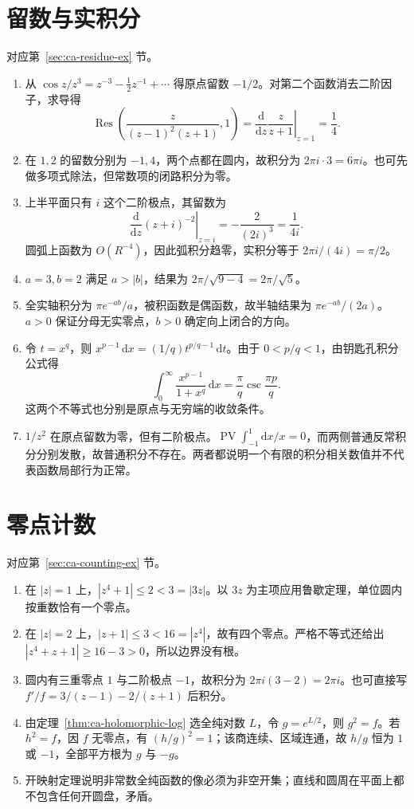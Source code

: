 \section{留数与实积分}
对应第~\ref{sec:ca-residue-ex} 节。
\begin{enumerate}
 \item 从 $\cos z/z^3=z^{-3}-\tfrac12z^{-1}+\cdots$ 得原点留数 $-1/2$。对第二个函数消去二阶因子，求导得
 \[
 \operatorname{Res}\left(\frac z{(z-1)^2(z+1)},1\right)
 =\left.\frac{\mathrm d}{\mathrm dz}\frac z{z+1}\right|_{z=1}
 =\frac14.
 \]
 \item 在 $1,2$ 的留数分别为 $-1,4$，两个点都在圆内，故积分为 $2\pi i\cdot3=6\pi i$。也可先做多项式除法，但常数项的闭路积分为零。
 \item 上半平面只有 $i$ 这个二阶极点，其留数为
 \[
 \left.\frac{\mathrm d}{\mathrm dz}(z+i)^{-2}\right|_{z=i}
 =-\frac2{(2i)^3}=\frac1{4i}.
 \]
 圆弧上函数为 $O(R^{-4})$，因此弧积分趋零，实积分等于 $2\pi i/(4i)=\pi/2$。
 \item $a=3,b=2$ 满足 $a>|b|$，结果为 $2\pi/\sqrt{9-4}=2\pi/\sqrt5$。
 \item 全实轴积分为 $\pi e^{-ab}/a$，被积函数是偶函数，故半轴结果为 $\pi e^{-ab}/(2a)$。$a>0$ 保证分母无实零点，$b>0$ 确定向上闭合的方向。
 \item 令 $t=x^q$，则 $x^{p-1}\,\mathrm dx=(1/q)t^{p/q-1}\,\mathrm dt$。由于 $0<p/q<1$，由钥匙孔积分公式得
 \[
 \int_0^\infty\frac{x^{p-1}}{1+x^q}\,\mathrm dx
 =\frac\pi q\csc\frac{\pi p}q.
 \]
 这两个不等式也分别是原点与无穷端的收敛条件。
 \item $1/z^2$ 在原点留数为零，但有二阶极点。$\operatorname{PV}\int_{-1}^1\mathrm dx/x=0$，而两侧普通反常积分分别发散，故普通积分不存在。两者都说明一个有限的积分相关数值并不代表函数局部行为正常。
\end{enumerate}

\section{零点计数}
对应第~\ref{sec:ca-counting-ex} 节。
\begin{enumerate}
 \item 在 $|z|=1$ 上，$|z^4+1|\le2<3=|3z|$。以 $3z$ 为主项应用鲁歇定理，单位圆内按重数恰有一个零点。
 \item 在 $|z|=2$ 上，$|z+1|\le3<16=|z^4|$，故有四个零点。严格不等式还给出 $|z^4+z+1|\ge16-3>0$，所以边界没有根。
 \item 圆内有三重零点 $1$ 与二阶极点 $-1$，故积分为 $2\pi i(3-2)=2\pi i$。也可直接写 $f'/f=3/(z-1)-2/(z+1)$ 后积分。
 \item 由定理~\ref{thm:ca-holomorphic-log} 选全纯对数 $L$，令 $g=e^{L/2}$，则 $g^2=f$。若 $h^2=f$，因 $f$ 无零点，有 $(h/g)^2=1$；该商连续、区域连通，故 $h/g$ 恒为 $1$ 或 $-1$，全部平方根为 $g$ 与 $-g$。
 \item 开映射定理说明非常数全纯函数的像必须为非空开集；直线和圆周在平面上都不包含任何开圆盘，矛盾。
\end{enumerate}

